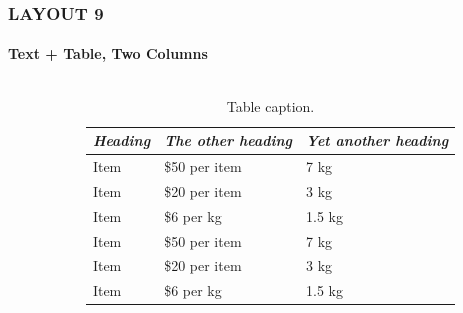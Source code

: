 \documentclass[14 pt]{beamer}
\begin{document}
\begin{frame}[t]
\frametitle{LAYOUT 9}
\framesubtitle{Text + Table, Two Columns}

\begin{columns}[t]
  \begin{column}{0.45\textwidth}
    \lipsum[7]
    \vskip0.5cm%
    \lipsum[8]
  \end{column}

  \begin{column}{0.45\textwidth}
    \begin{table}
      \caption{Table caption.}
      \begin{tabular}{p{}p{}p{}}
        \hline
        \emph{Heading} & \emph{The other heading} & \emph{Yet another heading} \\
        \hline
        Item & \$50 per item & 7 kg \\
        Item & \$20 per item & 3 kg\\
        Item & \$6 per kg & 1.5 kg\\
        Item & \$50 per item & 7 kg \\
        Item & \$20 per item & 3 kg\\
        Item & \$6 per kg & 1.5 kg\\
        \hline
      \end{tabular}
    \end{table}
\end{column}

\end{columns}
\end{frame}

\end{document}
